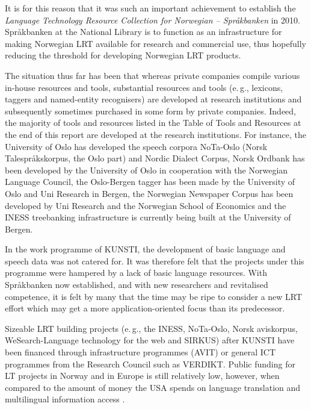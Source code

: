 \begin{multicols}{2}

It is for this reason that it was such an important achievement to establish the \textit{Language Technology Resource Collection for Norwegian -- Språkbanken} in 2010.
Språkbanken at the National Library is to function as an infrastructure for making Norwegian LRT available for research and commercial use, thus hopefully reducing the threshold for developing Norwegian LRT products. 

The situation thus far has been that whereas private companies compile
various in-house resources and tools, substantial resources and tools
(e.\,g., lexicons, taggers and named-entity recognisers) are developed at research institutions and subsequently sometimes purchased in some form by private companies. 
Indeed, the majority of tools and resources listed in the Table of Tools and Resources at the end of this report are developed at the research institutions. 
For instance, the University of Oslo has developed the speech corpora NoTa-Oslo (Norsk Talespråkskorpus, the Oslo part) and Nordic Dialect Corpus, Norsk Ordbank has been developed by the University of Oslo in cooperation with the Norwegian Language Council, the Oslo-Bergen tagger has been made by the University of Oslo and Uni Research in Bergen, the Norwegian Newspaper Corpus has been developed by Uni Research and the Norwegian School of Economics and the INESS treebanking infrastructure is currently being built at the University of Bergen.

In the work programme of KUNSTI, the development of basic language and speech data was not catered for. 
It was therefore felt that the projects under this programme were hampered by a lack of basic language resources. 
With Språkbanken now established, and with new researchers and revitalised competence, it is felt by many that the time may be ripe to consider a new LRT effort which may get a more application-oriented focus than its predecessor. 

Sizeable LRT building projects (e.\,g., the INESS, NoTa-Oslo, Norsk aviskorpus, WeSearch-Language technology for the web and SIRKUS) after KUNSTI have been financed through infrastructure programmes (AVIT) or general ICT programmes from the Research Council such as VERDIKT. 
Public funding for LT projects in Norway and in Europe is still relatively low, however, when compared to the amount of money the USA spends on language translation and multilingual information access \cite{laz1}. 


\end{multicols}
